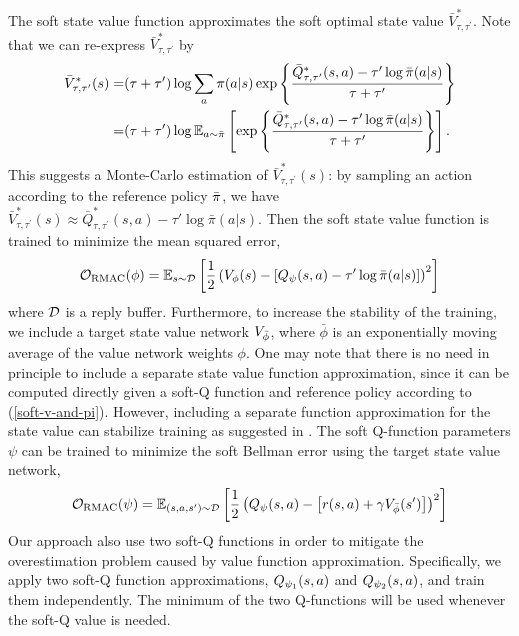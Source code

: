 The soft state value function approximates the soft optimal state value $\bar{V}_{\tau,\tau^{\prime}}^*$. Note that we can re-express $\bar{V}_{\tau,\tau^{\prime}}^*$ by 
\begin{align*}
\bar{V}_{\tau,\tau^{\prime}}^*(s) = & (\tau + \tau') \log \sum_a \pi(a|s) \exp \left\{ \frac{\bar{Q}_{\tau,\tau^{\prime}}^*(s,a) - \tau' \log \bar{\pi}(a|s)} {\tau + \tau'} \right\} \\ 
= & (\tau + \tau') \log \mathbb{E} _ {a\sim \bar{\pi}} \left[ \exp \left\{ \frac{\bar{Q}_{\tau,\tau^{\prime}}^*(s,a) - \tau' \log \bar{\pi}(a|s)} {\tau + \tau'} \right\} \right].
\end{align*}
This suggests a Monte-Carlo estimation of $\bar{V}_{\tau,\tau^{\prime}}^*(s)$: by sampling an action according to the reference policy $\bar{\pi}$, we have $\bar{V}_{\tau,\tau^{\prime}}^*(s) \approx  \bar{Q}_{\tau,\tau^{\prime}}^*(s,a) - \tau' \log \bar{\pi}(a|s) $. Then the soft state value function is trained to minimize the mean squared error,
\begin{equation*}
{\mathcal{O}}_{\text{RMAC}} (\phi) = \mathbb{E}_{s\sim {\mathcal{D}}} \left[ \frac{1}{2} \left( V_{\phi}(s) -  \left[ Q_{\psi}(s,a ) - \tau' \log \bar{\pi}(a|s) \right] \right)^2 \right]
\end{equation*}
where ${\mathcal{D}}$ is a reply buffer. Furthermore, to increase the stability of the training, we include a target state value network $V_{\bar{\phi}}$, where $\bar{\phi}$ is an exponentially moving average of the value network weights $\phi$. One may note that there is no need in principle to include a separate state value function approximation, since it can be computed directly given a soft-Q function and reference policy according to (\ref{soft-v-and-pi}). However, including a separate function approximation for the state value can stabilize training as suggested in \citep{haarnoja2018soft}. The soft Q-function parameters $\psi$ can be trained to minimize the soft Bellman error using the target state value network,
\begin{equation*}
{\mathcal{O}}_{\text{RMAC}} (\psi) = \mathbb{E}_{(s,a,s') \sim {\mathcal{D}}} \left[ \frac{1}{2} \left( Q_{\psi}(s,a) - \left[r(s,a) + \gamma V_{\bar{\phi}}(s') \right] \right)^2 \right]
\end{equation*}
Our approach also use two soft-Q functions in order to mitigate the overestimation problem caused by value function approximation. Specifically, we apply two soft-Q function approximations, $Q_{\psi_1}(s,a)$ and $Q_{\psi_2}(s,a)$, and train them independently.  The minimum of the two Q-functions will be used whenever the soft-Q value is needed. 


